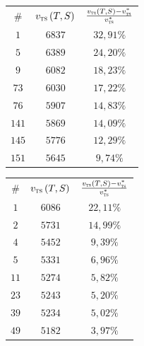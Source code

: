 \begin{figure}[!htbp]
	\null\hfill
	\begin{subfigure}[b]{0.3\textwidth}
		\centering
		\begin{tabular}{ccc}
			\hline
			\# & $v_{\textsc{ts}} \left( T, S \right)$ & $\frac{v_{\textsc{ts}} \left( T, S \right) - v_{\textsc{ts}}^{\ast}}{v_{\textsc{ts}}^{\ast}}$ \\
			$1$	&	$6837$	&	$32,91\%$ \\
			$5$	&	$6389$	&	$24,20\%$ \\
			$9$	&	$6082$	&	$18,23\%$ \\
			$73$	&	$6030$	&	$17,22\%$ \\
			$76$	&	$5907$	&	$14,83\%$ \\
			$141$	&	$5869$	&	$14,09\%$ \\
			$145$	&	$5776$	&	$12,29\%$ \\
			$151$	&	$5645$	&	$9,74\%$ \\\hline                                                                                                    
		\end{tabular}
		\caption{}
		\label{fig:rrimst2tab:a}
	\end{subfigure}
	\hfill
	\begin{subfigure}[b]{0.3\textwidth}
		\centering
		\begin{tabular}{ccc}
			\hline
			\# & $v_{\textsc{ts}} \left( T, S \right)$ & $\frac{v_{\textsc{ts}} \left( T, S \right) - v_{\textsc{ts}}^{\ast}}{v_{\textsc{ts}}^{\ast}}$ \\
			$1$	&	$6086$	&	$22,11\%$	\\
			$2$	&	$5731$	&	$14,99\%$	\\
			$4$	&	$5452$	&	$9,39\%$	\\
			$5$	&	$5331$	&	$6,96\%$	\\
			$11$	&	$5274$	&	$5,82\%$	\\
			$23$	&	$5243$	&	$5,20\%$	\\
			$39$	&	$5234$	&	$5,02\%$	\\
			$49$	&	$5182$	&	$3,97\%$	\\\hline                                                                                                  
		\end{tabular}
		\caption{}
		\label{fig:rrimst2tab:b}
	\end{subfigure}
	\hfill
	\begin{subfigure}[b]{0.3\textwidth}
		\centering
		\begin{tabular}{ccc}
			\hline

\end{tabular}
\end{subfigure}
\end{figure}

